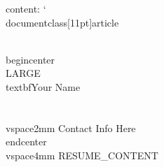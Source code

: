 content: `\\documentclass[11pt]{article}
\begin{document}
\\begin{center}
    {\\LARGE \\textbf{Your Name}}\\\\
    \\vspace{2mm}
    Contact Info Here
\\end{center}
\\vspace{4mm}
{{RESUME_CONTENT}}
\
\end{document}
